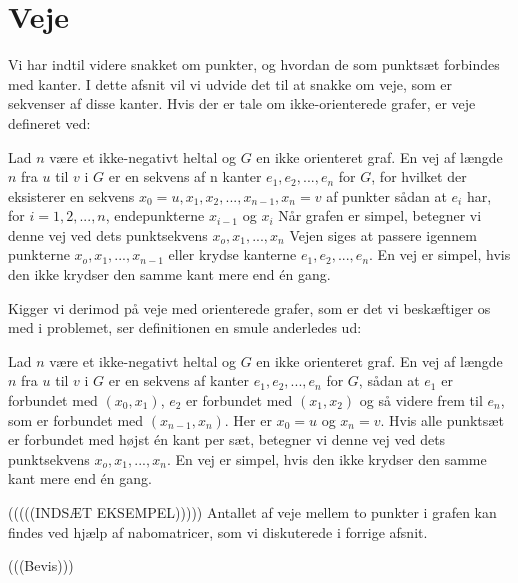\section{Veje}
Vi har indtil videre snakket om punkter, og hvordan de som punktsæt forbindes med kanter. I dette afsnit vil vi udvide det til at snakke om veje, som er sekvenser af disse kanter. Hvis der er tale om ikke-orienterede grafer, er veje defineret ved:
\begin{definition}
[Veje] 
Lad $n$ være et ikke-negativt heltal og $G$ en ikke orienteret graf. En vej af længde $n$ fra $u$ til $v$ i $G$ er en sekvens af n kanter $e_{1},e_{2},...,e_{n}$ for $G$, for hvilket der eksisterer en sekvens $x_{0}=u,x_{1},x_{2},...,x_{n-1},x_{n}=v$ af punkter sådan at $e_{i}$ har, for $i=1,2,...,n$, endepunkterne $x_{i-1}$ og $x_{i}$ Når grafen er simpel, betegner vi denne  vej ved dets punktsekvens $x_{o},x_{1},...,x_{n}$ Vejen siges at passere igennem punkterne $x_{o},x_{1},...,x_{n-1}$ eller krydse kanterne $e_{1},e_{2},...,e_{n}$. En vej er simpel, hvis den ikke krydser den samme kant mere end én gang.
\end{definition}
Kigger vi derimod på veje med orienterede grafer, som er det vi beskæftiger os med i problemet, ser definitionen en smule anderledes ud:
\begin{definition}
[Veje] 
Lad $n$ være et ikke-negativt heltal og $G$ en ikke orienteret graf. En vej af længde $n$ fra $u$ til $v$ i $G$ er en sekvens af kanter $e_{1},e_{2},...,e_{n}$ for $G$, sådan at $e_{1}$ er forbundet med $(x_{0},x_{1})$, $e_{2}$ er forbundet med $(x_{1},x_{2})$ og så videre frem til $e_{n}$, som er forbundet med $(x_{n-1},x_{n})$. Her er $x_{0}=u$ og $x_{n}=v$. Hvis alle punktsæt er forbundet med højst én kant per sæt, betegner vi denne  vej ved dets punktsekvens $x_{o},x_{1},...,x_{n}$. En vej er simpel, hvis den ikke krydser den samme kant mere end én gang.
\end{definition}

(((((INDSÆT EKSEMPEL)))))
Antallet af veje mellem to punkter i grafen kan findes ved hjælp af nabomatricer, som vi diskuterede i forrige afsnit.
\begin{definition}

\end{definition}


(((Bevis)))


